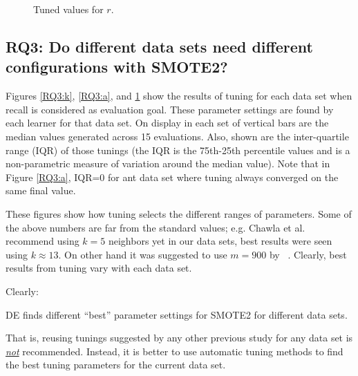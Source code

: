 \begin{figure}[!t]
\begin{minipage}{.33\textwidth}
        \caption{Tuned values for $r$.}
        \label{RQ3:b}
    \end{minipage}
\end{figure}

\subsection{\textbf{RQ3: Do different data sets
      need different configurations with SMOTE2?}}

Figures \ref{RQ3:k}, \ref{RQ3:a}, and \ref{RQ3:b} show the results of tuning for each data set when recall is considered as evaluation goal. These parameter settings are found by each learner for that data set.
On display in each set of vertical bars are
the median values generated across 15 evaluations.
Also, shown are
the inter-quartile range (IQR) of those tunings (the IQR is the 75th-25th percentile values and is a non-parametric measure of variation
around the median value). Note that in Figure \ref{RQ3:a}, IQR=0 for  ant data set where tuning
          always converged on the same final value.

  These figures
show how tuning selects the different ranges  of
parameters.
Some of the above numbers are far from the standard values; e.g. Chawla et al.~\cite{chawla2002smote} recommend using $k=5$ neighbors yet in our data sets, best results were seen using $k \approx 13$. On other hand it was suggested to use $m=900$ by ~\cite{pears2014synthetic}.
Clearly,
best results from tuning
vary with each data set.

Clearly:
\begin{lesson1}
    DE finds different ``best'' parameter settings for SMOTE2 for different data sets.
\end{lesson1}
 That is,  reusing tunings  suggested  by  any other  previous study  for any data set is \underline{{\em not}} recommended. Instead,  it is better to
      use  automatic  tuning  methods  to find the best tuning parameters for the current data set.
      
